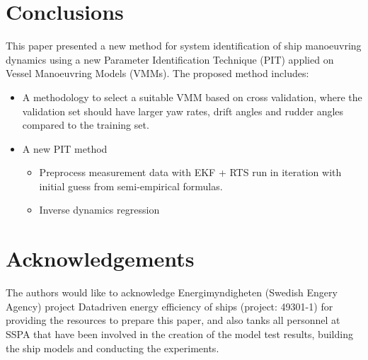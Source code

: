 \documentclass[review]{elsarticle}
\begin{document}
\section{Conclusions}
\label{\detokenize{10.01_conclusions:conclusions}}\label{\detokenize{10.01_conclusions:id1}}\label{\detokenize{10.01_conclusions::doc}}

This paper presented a new method for system identification of ship manoeuvring dynamics using a new Parameter Identification Technique (PIT) applied on Vessel Manoeuvring Models (VMMs). The proposed method includes:
\begin{itemize}
    \item A methodology to select a suitable VMM based on cross validation, where the validation set should have larger yaw rates, drift angles and rudder angles compared to the training set.
    
    \item A new PIT method
    \begin{itemize}
        \item Preprocess measurement data with EKF + RTS run in iteration with initial guess from semi-empirical formulas.
        \item Inverse dynamics regression
    \end{itemize}
    
    
    
\end{itemize}

\section{Acknowledgements}
\label{\detokenize{acknowledgements:acknowledgements}}\label{\detokenize{acknowledgements::doc}}
\sphinxAtStartPar
The authors would like to acknowledge Energimyndigheten (Swedish Engery Agency) project Data\sphinxhyphen{}driven energy efficiency of ships (project: 49301-1) for providing the resources to prepare this paper, and also tanks all personnel at SSPA that have been involved in the creation of the model test results, building the ship models and conducting the experiments.

\sphinxAtStartPar
\end{document}
